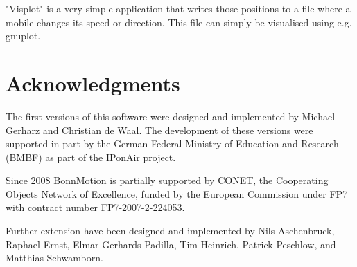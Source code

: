 \documentclass[11pt,a4paper,twoside,normalheadings,headsepline,DIV13,BCOR11mm,openright]{article}
\begin{document}
"Visplot"  is a very simple application that writes those positions to a
file where a mobile changes its speed or direction. This file can simply
be visualised using e.g. gnuplot.


\section{Acknowledgments}
The first versions of this software were designed and implemented by
Michael Gerharz and Christian de Waal. The development of these
versions were supported in part by the German Federal Ministry of
Education and Research (BMBF) as part of the IPonAir project.

Since 2008 BonnMotion is partially supported by CONET, the Cooperating
Objects Network of Excellence, funded by the European Commission under
FP7 with contract number FP7-2007-2-224053.

Further extension have been designed and implemented by Nils
Aschenbruck, Raphael Ernst, Elmar Gerhards-Padilla, Tim Heinrich,
Patrick Peschlow, and Matthias Schwamborn.

\clearpage



\end{document}

